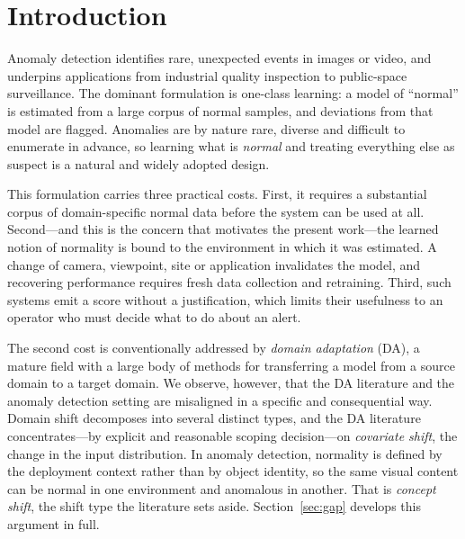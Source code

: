\documentclass[a4paper,fleqn]{cas-sc}
\begin{document}

\section{Introduction}

Anomaly detection identifies rare, unexpected events in images or video, and
underpins applications from industrial quality inspection to public-space
surveillance. The dominant formulation is one-class learning: a model of
``normal'' is estimated from a large corpus of normal samples, and deviations
from that model are flagged. Anomalies are by nature rare, diverse and difficult
to enumerate in advance, so learning what is \emph{normal} and treating
everything else as suspect is a natural and widely adopted design.

This formulation carries three practical costs. First, it requires a substantial
corpus of domain-specific normal data before the system can be used at all.
Second---and this is the concern that motivates the present work---the learned
notion of normality is bound to the environment in which it was estimated. A
change of camera, viewpoint, site or application invalidates the model, and
recovering performance requires fresh data collection and retraining. Third,
such systems emit a score without a justification, which limits their
usefulness to an operator who must decide what to do about an alert.

The second cost is conventionally addressed by \emph{domain adaptation} (DA), a
mature field with a large body of methods for transferring a model from a source
domain to a target domain. We observe, however, that the DA literature and the
anomaly detection setting are misaligned in a specific and consequential way.
Domain shift decomposes into several distinct types, and the DA literature
concentrates---by explicit and reasonable scoping decision---on
\emph{covariate shift}, the change in the input distribution. In anomaly
detection, normality is defined by the deployment context rather than by object
identity, so the same visual content can be normal in one environment and
anomalous in another. That is \emph{concept shift}, the shift type the
literature sets aside. Section~\ref{sec:gap} develops this argument in full.
\end{document}
